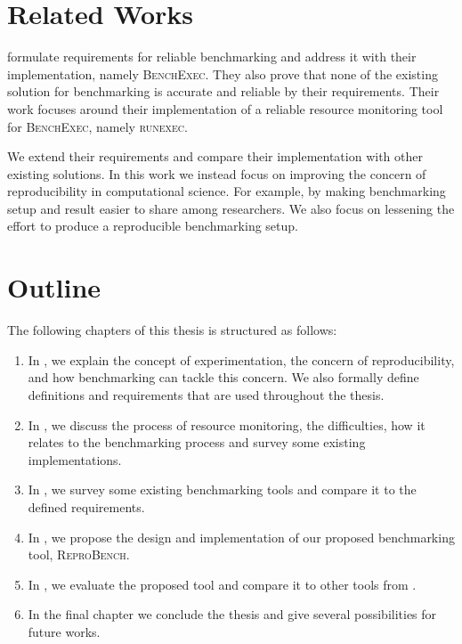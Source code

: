 \section{Related Works}
\label{sec:intro.related}

\citet{beyerReliableBenchmarkingRequirements2019} formulate requirements for reliable benchmarking and address it with their implementation, namely \textsc{BenchExec}.
They also prove that none of the existing solution for benchmarking is accurate and reliable by their requirements.
Their work focuses around their implementation of a reliable resource monitoring tool for \textsc{BenchExec}, namely \textsc{runexec}.

We extend their requirements and compare their implementation with other existing solutions.
In this work we instead focus on improving the concern of reproducibility in computational science.
For example, by making benchmarking setup and result easier to share among researchers.
We also focus on lessening the effort to produce a reproducible benchmarking setup.


\section{Outline}
\label{sec:intro.outline}

The following chapters of this thesis is structured as follows:

\begin{enumerate}
	\item In , we explain the concept of experimentation, the concern of reproducibility, and how benchmarking can tackle this concern. We also formally define definitions and requirements that are used throughout the thesis.
	\item In , we discuss the process of resource monitoring, the difficulties, how it relates to the benchmarking process and survey some existing implementations.
	\item In , we survey some existing benchmarking tools and compare it to the defined requirements.
	\item In , we propose the design and implementation of our proposed benchmarking tool, \textsc{ReproBench}.
	\item In , we evaluate the proposed tool and compare it to other tools from .
	\item In the final chapter we conclude the thesis and give several possibilities for future works.
\end{enumerate}
